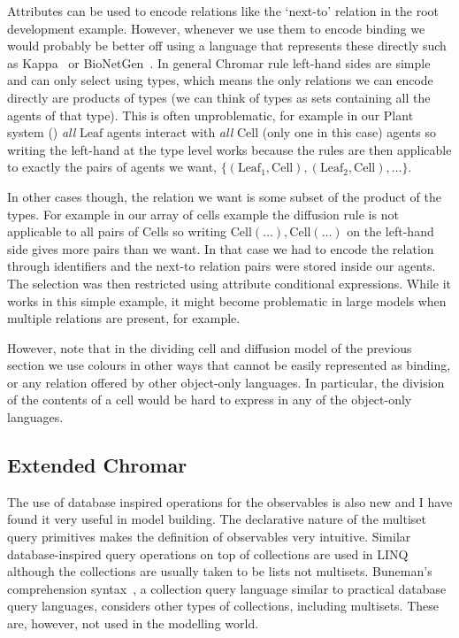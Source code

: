 Attributes can be used to encode relations like the `next-to' relation in the
root development example.  However, whenever we use them to encode binding we
would probably be better off using a language that represents these directly
such as Kappa~\citep{danos_rule-based_2008} or
BioNetGen~\citep{blinov_bionetgen:_2004}. In general Chromar rule left-hand
sides are simple and can only select using types, which means the only relations
we can encode directly are products of types (we can think of types as sets
containing all the agents of that type). This is often unproblematic, for
example in our Plant system () \textit{all} $\mathrm{Leaf}$
agents interact with \textit{all} $\mathrm{Cell}$ (only one in this case) agents
so writing the left-hand at the type level works because the rules are then
applicable to exactly the pairs of agents we want,
$\{ (\mathrm{Leaf}_1, \mathrm{Cell}), (\mathrm{Leaf}_2, \mathrm{Cell}), \dots
\}$.

In other cases though, the relation we want is some subset of the product of the
types. For example in our array of cells example the diffusion rule is not
applicable to all pairs of $\mathrm{Cell}$s so writing
$\mathrm{Cell}(\dots), \mathrm{Cell}(\dots)$ on the left-hand side gives more
pairs than we want.  In that case we had to encode the relation through
identifiers and the next-to relation pairs were stored inside our agents. The
selection was then restricted using attribute conditional expressions. While it
works in this simple example, it might become problematic in large models when
multiple relations are present, for example.

However, note that in the dividing cell and diffusion model of the previous
section we use colours in other ways that cannot be easily represented as
binding, or any relation offered by other object-only languages. In particular,
the division of the contents of a cell would be hard to express in any of the
object-only languages.


\subsection{Extended Chromar}
The use of database inspired operations for the observables is also new and I
have found it very useful in model building. The declarative nature of the
multiset query primitives makes the definition of observables very
intuitive. Similar database-inspired query operations on top of collections are
used in LINQ~\citep{budiu_compiler_2013} although the collections are usually taken
to be lists not multisets. Buneman's comprehension
syntax~\citep{buneman_comprehension_1994}, a collection query language similar to
practical database query languages, considers other types of collections,
including multisets. These are, however, not used in the modelling world.

